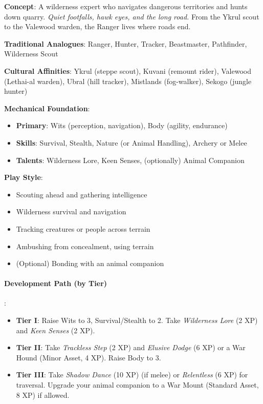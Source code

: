 \textbf{Concept}: A wilderness expert who navigates dangerous territories and hunts down quarry. \emph{Quiet footfalls, hawk eyes, and the long road.} From the Ykrul scout to the Valewood warden, the Ranger lives where roads end.

\textbf{Traditional Analogues}: Ranger, Hunter, Tracker, Beastmaster, Pathfinder, Wilderness Scout

\textbf{Cultural Affinities}: Ykrul (steppe scout), Kuvani (remount rider), Valewood (Lethai-al warden), Ubral (hill tracker), Mistlands (fog-walker), Sekogo (jungle hunter)

\textbf{Mechanical Foundation}:
\begin{itemize}
\item \textbf{Primary}: Wits (perception, navigation), Body (agility, endurance)
\item \textbf{Skills}: Survival, Stealth, Nature (or Animal Handling), Archery or Melee
\item \textbf{Talents}: Wilderness Lore, Keen Senses, (optionally) Animal Companion
\end{itemize}

\textbf{Play Style}:
\begin{itemize}
\item Scouting ahead and gathering intelligence
\item Wilderness survival and navigation
\item Tracking creatures or people across terrain
\item Ambushing from concealment, using terrain
\item (Optional) Bonding with an animal companion
\end{itemize}

\paragraph{Development Path (by Tier)}:
\begin{itemize}
\item \textbf{Tier I}: Raise Wits to 3, Survival/Stealth to 2. Take \emph{Wilderness Lore} (2 XP) and \emph{Keen Senses} (2 XP).
\item \textbf{Tier II}: Take \emph{Trackless Step} (2 XP) and \emph{Elusive Dodge} (6 XP) or a War Hound (Minor Asset, 4 XP). Raise Body to 3.
\item \textbf{Tier III}: Take \emph{Shadow Dance} (10 XP) (if melee) or \emph{Relentless} (6 XP) for traversal. Upgrade your animal companion to a War Mount (Standard Asset, 8 XP) if allowed.
\end{itemize}

